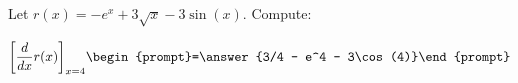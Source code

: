 \documentclass{ximera}
\author{Bart Snapp}
\begin{document}
\begin{exercise}

Let $r(x) = -e^x+3 \sqrt{x}-3 \sin (x)$. Compute:

\[
\bigg[ \frac{d}{dx} r(x) \bigg]_{x=4}
\begin{prompt}=\answer{3/4 - e^4 - 3\cos(4)}\end{prompt}
\]
\end{exercise}
\end{document}
